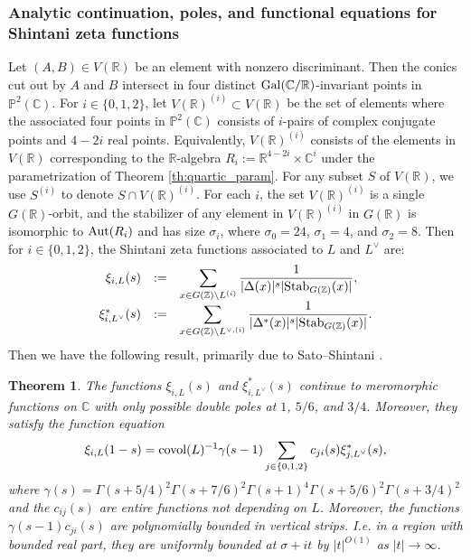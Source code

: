 \documentclass{article}
\def\Z{{\mathbb Z}}
\def\ra{{\rightarrow}}
\def\Stab{{\rm Stab}}
\def\Gal{{\rm Gal}}
\def\P{{\mathbb P}}
\def\Aut{{\rm Aut}}
\def\covol{{\rm covol}}
\def\R{{\mathbb R}}
\def\Z{{\mathbb Z}}
\def\P{{\mathbb P}}
\def\C{{\mathbb C}}
\newtheorem{theorem}{Theorem}[section]
\begin{document}
\subsubsection*{Analytic continuation, poles, and functional equations for Shintani zeta functions} Let $(A,B)\in V(\R)$ be an element with nonzero discriminant. Then the conics cut out by $A$ and $B$ intersect in four distinct $\Gal(\C/\R)$-invariant points in $\P^2(\C)$. For $i\in\{0,1,2\}$, let $V(\R)^{(i)}\subset V(\R)$ be the set of elements where the associated four points in $\P^2(\C)$ consists of $i$-pairs of complex conjugate points and $4-2i$ real points. Equivalently, $V(\R)^{(i)}$ consists of the elements in $V(\R)$ corresponding to the $\R$-algebra $R_i:=\R^{4-2i}\times \C^i$ under the parametrization of Theorem \ref{th:quartic_param}. For any subset $S$ of $V(\R)$, we use $S^{(i)}$ to denote $S\cap V(\R)^{(i)}$. For each $i$, the set $V(\R)^{(i)}$ is a single $G(\R)$-orbit, and the stabilizer of any element in $V(\R)^{(i)}$ in $G(\R)$ is isomorphic to $\Aut(R_i)$ and has size $\sigma_i$, where $\sigma_0=24$, $\sigma_1=4$, and $\sigma_2=8$.
Then for $i\in\{0,1,2\}$, the Shintani zeta functions associated to $L$ and $L^\vee$ are:
\begin{equation*}
\begin{array}{rcl}
\xi_{i,L}(s)&:=&\displaystyle\sum_{x\in G(\Z)\backslash L^{(i)}}
\frac{1}{|\Delta(x)|^s|\Stab_{G(\Z)}(x)|},
\\[.15in]
\xi_{i,L^\vee}^{*}(s)&:=&\displaystyle\sum_{x\in G(\Z)\backslash L^{\vee,(i)}}
\frac{1}{|\Delta^*(x)|^s|\Stab_{G(\Z)}(x)|}.
\end{array}
\end{equation*}
Then we have the following result, primarily due to Sato--Shintani \cite{SatoShintani}.
\begin{theorem}\label{th:SZF_v1}
The functions $\xi_{i,L}(s)$ and $\xi_{i,L^\vee}^{*}(s)$ continue to meromorphic functions on $\C$ with only possible double poles at $1$, $5/6$, and $3/4$. Moreover, they satisfy the function equation
\begin{equation*}
\xi_{i,L}(1-s)=\covol(L)^{-1}\gamma(s-1)\sum_{j\in\{0,1,2\}}c_{ji}(s)\xi^*_{j,L^\vee}(s),
\end{equation*}
where $\gamma(s)=\Gamma(s+5/4)^2\Gamma(s+7/6)^2\Gamma(s+1)^4\Gamma(s+5/6)^2\Gamma(s+3/4)^2$ and the $c_{ij}(s)$ are entire functions not depending on $L$. Moreover, the functions $\gamma(s-1)c_{ji}(s)$ are polynomially bounded in vertical strips. I.e. in a region with bounded real part, they are uniformly bounded at $\sigma+it$ by $|t|^{O(1)}$ as $|t|\ra\infty$. 
\end{theorem}
\end{document}
